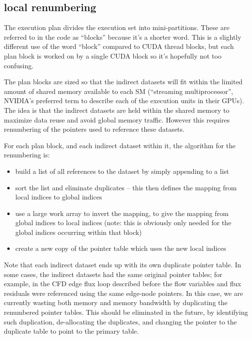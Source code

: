 \documentclass[12pt]{article}
\begin{document}
\subsection{local renumbering}

The execution plan divides the execution set into mini-partitions.
These are referred to in the code as ``blocks'' because it's a 
shorter word. This is a slightly different use of the word ``block'' 
compared to CUDA thread blocks, but each plan block is worked on by 
a single CUDA block so it's hopefully not too confusing.

The plan blocks are sized so that the indirect datasets will fit 
within the limited amount of shared memory available to each SM 
(``streaming multiprocessor'', NVIDIA's preferred term to describe 
each of the execution units in their GPUs).  The idea is that the
indirect datasets are held within the shared memory to maximize data 
reuse and avoid global memory traffic.  However this requires 
renumbering of the pointers used to reference these datasets.


For each plan block, and each indirect dataset within it, the 
algorithm for the renumbering is:
\begin{itemize}
\item
build a list of all references to the dataset by simply appending 
to a list
\item
sort the list and eliminate duplicates -- this then defines the 
mapping from local indices to global indices
\item
use a large work array to invert the mapping, to give the mapping 
from global indices to local indices (note: this is obviously only
needed for the global indices occurring within that block)
\item
create a new copy of the pointer table which uses the new local 
indices
\end{itemize}

Note that each indirect dataset ends up with its own duplicate 
pointer table.  In some cases, the indirect datasets had the same
original pointer tables; for example, in the CFD edge flux loop 
described before the flow variables and flux residuals were 
referenced using the same edge-node pointers.  In this case,
we are currently wasting both memory and memory bandwidth by 
duplicating the renumbered pointer tables.  This should be 
eliminated in the future, by identifying such duplication, 
de-allocating the duplicates, and changing the pointer to the 
duplicate table to point to the primary table.
\end{document}
